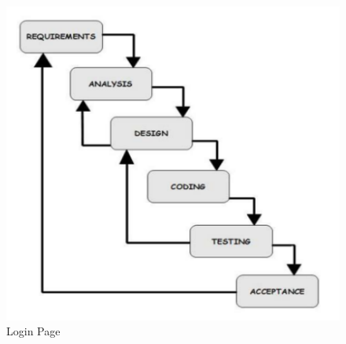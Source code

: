 \begin{figure}[H]
\centering \includegraphics[scale=0.7]{image/sdlc.png}
\caption{Login Page}
\end{figure}
